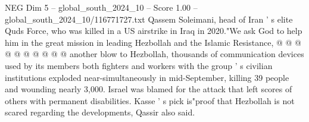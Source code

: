 \begin{textsample}{NEG Dim 5 – global\_south\_2024\_10 – Score 1.00 – global\_south\_2024\_10/116771727.txt}
Qassem Soleimani, head of Iran ' s elite Quds Force, who was killed in a US airstrike in Iraq in 2020."We ask God to help him in the great mission in leading Hezbollah and the Islamic Resistance, @ @ @ @ @ @ @ @ @ @ another blow to Hezbollah, thousands of communication devices used by its members both fighters and workers with the group ' s civilian institutions exploded near-simultaneously in mid-September, killing 39 people and wounding nearly 3,000.
Israel was blamed for the attack that left scores of others with permanent disabilities.
Kasse ' s pick is"proof that Hezbollah is not scared regarding the developments, Qassir also said.

\end{textsample}
